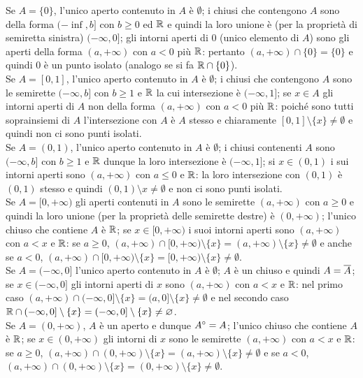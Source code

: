\documentclass[a4paper]{article}\par \usepackage{style}\par
\begin{document}
Se $ A = \{0\} $, l'unico aperto contenuto in $ A $ è $ \emptyset $; i chiusi che contengono $ A $ sono della forma $ (-\inf, b] $ con $ b \geq 0 $ ed $ \mathbb{R} $ e quindi la loro unione è (per la proprietà di semiretta sinistra) $ (-\infty, 0] $; gli intorni aperti di 0 (unico elemento di $ A $) sono gli aperti della forma $ (a, +\infty) $ con $ a < 0 $ più $ \mathbb{R} $: pertanto $ (a, +\infty) \cap \{0\} = \{0\} $ e quindi $ 0 $ è un punto isolato (analogo se si fa $ \mathbb{R} \cap \{0\} $). \\
Se $ A = [0, 1] $, l'unico aperto contenuto in $ A $ è $ \emptyset $; i chiusi che contengono $ A $ sono le semirette $ (-\infty, b] $ con $ b \geq 1 $ e $ \mathbb{R} $ la cui intersezione è $ (-\infty, 1] $; se $ x \in A $ gli intorni aperti di $ A $ non della forma $ (a, +\infty) $ con $ a < 0 $ più $ \mathbb{R} $: poiché sono tutti soprainsiemi di $ A $ l'intersezione con $ A $ è $ A $ stesso e chiaramente $ [0, 1] \setminus \{x\} \neq \emptyset $ e quindi non ci sono punti isolati.\\
Se $ A = (0, 1) $, l'unico aperto contenuto in $ A $ è $ \emptyset $; i chiusi contenenti $ A $ sono $ (-\infty, b] $ con $ b \geq 1 $ e $ \mathbb{R} $ dunque la loro intersezione è $ (-\infty, 1] $; si $ x \in (0, 1) $ i sui intorni aperti sono $ (a, +\infty) $ con $ a \leq 0 $ e $ \mathbb{R} $: la loro intersezione con $ (0, 1) $ è $ (0, 1) $ stesso e quindi $ (0, 1) \setminus x \neq \emptyset $ e non ci sono punti isolati. \\
Se $ A = [0, +\infty) $ gli aperti contenuti in $ A $ sono le semirette $ (a, +\infty) $ con $ a \geq 0 $ e quindi la loro unione (per la proprietà delle semirette destre) è $ (0, +\infty) $; l'unico chiuso che contiene $ A $ è $ \mathbb{R} $; se $ x \in [0, +\infty) $ i suoi intorni aperti sono $ (a, +\infty) $ con $ a < x $ e $ \mathbb{R} $: se $ a \geq 0 $, $ (a, +\infty) \cap [0, +\infty) \setminus \{x\} = (a, +\infty) \setminus \{x\} \neq \emptyset $ e anche se $ a < 0 $, $ (a, +\infty) \cap [0, +\infty) \setminus \{x\} = [0, +\infty) \setminus \{x\} \neq \emptyset $. \\
Se $ A = (-\infty, 0] $ l'unico aperto contenuto in $ A $ è $ \emptyset $; $ A $ è un chiuso e quindi $ A = \overline{A} $; se $ x \in (-\infty, 0] $ gli intorni aperti di $ x $ sono $ (a, +\infty) $ con $ a < x $ e $ \mathbb{R} $: nel primo caso $ (a, +\infty) \cap (-\infty, 0] \setminus \{x\} = (a, 0] \setminus \{x\} \neq \emptyset $ e nel secondo caso $ \mathbb{R} \cap (-\infty, 0] \setminus \{x\} = (-\infty, 0] \setminus \{x\} \neq \varnothing $. \\
Se $ A = (0, +\infty) $, $ A $ è un aperto e dunque $ {A}^{\circ} = A $; l'unico chiuso che contiene $ A $ è $ \mathbb{R} $; se $ x \in (0, +\infty) $ gli intorni di $ x $ sono le semirette $ (a, +\infty) $ con $ a < x $ e $ \mathbb{R} $: se $ a \geq 0 $, $ (a, +\infty) \cap (0, +\infty) \setminus \{x\} = (a, +\infty) \setminus \{x\} \neq \emptyset $ e se $ a < 0 $, $ (a, +\infty) \cap (0, +\infty) \setminus \{x\} = (0, +\infty) \setminus \{x\} \neq \emptyset $. \\
\end{document}
